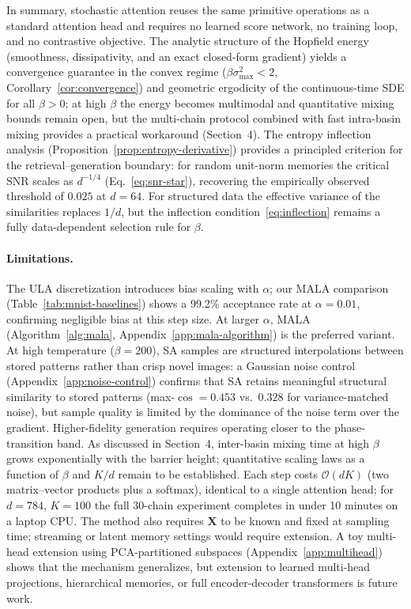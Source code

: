 In summary, stochastic attention reuses the same primitive operations as a standard attention head and requires no learned score network, no training loop, and no contrastive objective. The analytic structure of the Hopfield energy (smoothness, dissipativity, and an exact closed-form gradient) yields a convergence guarantee in the convex regime ($\beta\sigma_{\max}^{2}<2$, Corollary~\ref{cor:convergence}) and geometric ergodicity of the continuous-time SDE for all $\beta>0$; at high $\beta$ the energy becomes multimodal and quantitative mixing bounds remain open, but the multi-chain protocol combined with fast intra-basin mixing provides a practical workaround (Section~4). The entropy inflection analysis (Proposition~\ref{prop:entropy-derivative}) provides a principled criterion for the retrieval--generation boundary: for random unit-norm memories the critical SNR scales as $d^{-1/4}$ (Eq.~\ref{eq:snr-star}), recovering the empirically observed threshold of $0.025$ at $d{=}64$. For structured data the effective variance of the similarities replaces $1/d$, but the inflection condition~\eqref{eq:inflection} remains a fully data-dependent selection rule for $\beta$.

\paragraph{Limitations.}
The ULA discretization introduces bias scaling with $\alpha$; our MALA comparison (Table~\ref{tab:mnist-baselines}) shows a 99.2\% acceptance rate at $\alpha{=}0.01$, confirming negligible bias at this step size. At larger $\alpha$, MALA (Algorithm~\ref{alg:mala}, Appendix~\ref{app:mala-algorithm}) is the preferred variant. At high temperature ($\beta{=}200$), SA samples are structured interpolations between stored patterns rather than crisp novel images: a Gaussian noise control (Appendix~\ref{app:noise-control}) confirms that SA retains meaningful structural similarity to stored patterns (max-$\cos=0.453$ vs.\ $0.328$ for variance-matched noise), but sample quality is limited by the dominance of the noise term over the gradient. Higher-fidelity generation requires operating closer to the phase-transition band. As discussed in Section~4, inter-basin mixing time at high $\beta$ grows exponentially with the barrier height; quantitative scaling laws as a function of $\beta$ and $K/d$ remain to be established. Each step costs $\mathcal{O}(dK)$ (two matrix--vector products plus a softmax), identical to a single attention head; for $d{=}784$, $K{=}100$ the full 30-chain experiment completes in under 10 minutes on a laptop CPU. The method also requires $\mathbf{X}$ to be known and fixed at sampling time; streaming or latent memory settings would require extension. A toy multi-head extension using PCA-partitioned subspaces (Appendix~\ref{app:multihead}) shows that the mechanism generalizes, but extension to learned multi-head projections, hierarchical memories, or full encoder-decoder transformers is future work.
